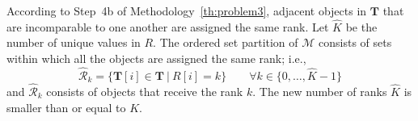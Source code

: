 \documentclass[acmsmall,screen, review]{acmart}
\begin{document}
\noindent According to Step~4b of Methodology~\ref{th:problem3}, adjacent objects in $\mathbf{T}$ that are incomparable to one another are assigned the same rank. Let $\hat{K}$ be the number of unique values in $R$.
The ordered set partition of $\mathcal{M}$ consists of sets within  which all the objects are assigned the  same rank; i.e.,
\begin{equation}
\label{eq:rank-sort}
\mathcal{\hat{R}}_k = \{ \mathbf{T}[i] \in \mathbf{T}\ | \  R[i] = k \} \qquad \forall k \in \{0, \dots, \hat{K}-1\}
\end{equation}
and $\mathcal{\hat{R}}_k$ consists of objects that receive the rank $k$. The new number of ranks $\hat{K}$ is smaller than or equal to $K$.

\end{document}
